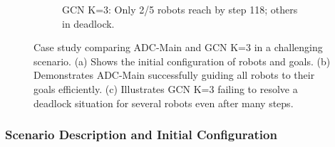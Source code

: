 \begin{figure}[htbp]
\begin{subfigure}[b]{0.32\textwidth}
        \caption{GCN K=3: Only 2/5 robots reach by step 118; others in deadlock.}
        \label{fig:cs_gcn_deadlock}
    \end{subfigure}
    \caption{Case study comparing ADC-Main and GCN K=3 in a challenging scenario. (a) Shows the initial configuration of robots and goals. (b) Demonstrates ADC-Main successfully guiding all robots to their goals efficiently. (c) Illustrates GCN K=3 failing to resolve a deadlock situation for several robots even after many steps.}
    \label{fig:case_study_deadlock_scenario}
\end{figure}

\subsubsection{Scenario Description and Initial Configuration}
\label{subsubsec:scenario_description}

